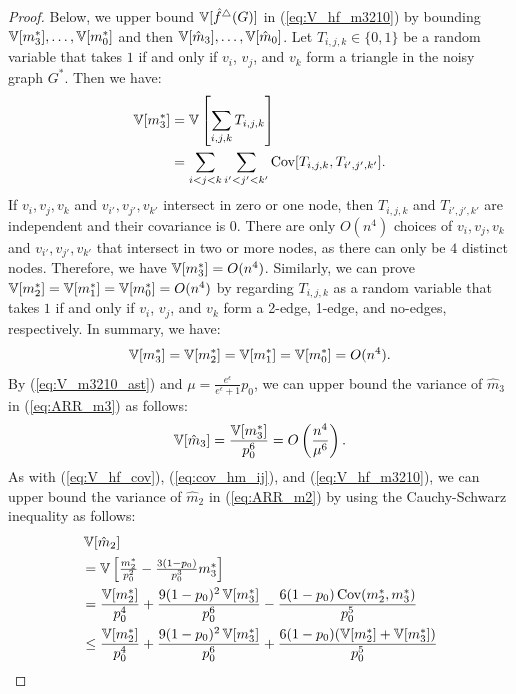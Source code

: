 \begin{proof}
Below, we upper bound $\operatorname{\mathbb{V}}[\hat{f}^\triangle(G)]$ in (\ref{eq:V_hf_m3210}) by bounding $\operatorname{\mathbb{V}}[m_3^*], \ldots, \allowbreak \operatorname{\mathbb{V}}[m_0^*]$ and then $\operatorname{\mathbb{V}}[\hat{m}_3], \ldots, \allowbreak \operatorname{\mathbb{V}}[\hat{m}_0]$.
Let $T_{i,j,k} \in \{0,1\}$ be a random variable that takes $1$ if and only if $v_i$, $v_j$, and $v_k$ form a triangle in the noisy graph $G^*$.
Then we have:
\begin{align*}
    \operatorname{\mathbb{V}}[m_3^*]
    &= \operatorname{\mathbb{V}}\left[\sum_{i,j,k} T_{i,j,k}\right] \\
    &= \sum_{i<j<k} \sum_{i'<j'<k'} \operatorname{\text{Cov}}[T_{i,j,k}, T_{i',j',k'}].
\end{align*}
If $v_i, v_j, v_k$ and $v_{i'}, v_{j'}, v_{k'}$ intersect in zero or one node, then $T_{i,j,k}$ and $T_{i',j',k'}$ are independent
and their covariance is $0$.
There are only $O(n^4)$ choices of $v_i, v_j, v_k$ and $v_{i'}, v_{j'}, v_{k'}$ that intersect in two or more nodes, as there can only be $4$ distinct nodes.
Therefore, we have $\operatorname{\mathbb{V}}[m_3^*] = O(n^4)$.
Similarly, we can prove $\operatorname{\mathbb{V}}[m_2^*] = \operatorname{\mathbb{V}}[m_1^*] = \operatorname{\mathbb{V}}[m_0^*] = O(n^4)$ by regarding $T_{i,j,k}$ as a random variable that takes $1$ if and only if $v_i$, $v_j$, and $v_k$ form a 2-edge, 1-edge, and no-edges, respectively.
In summary, we have:
\begin{align}
    \operatorname{\mathbb{V}}[m_3^*] = \operatorname{\mathbb{V}}[m_2^*] = \operatorname{\mathbb{V}}[m_1^*] = \operatorname{\mathbb{V}}[m_0^*] = O(n^4).
    \label{eq:V_m3210_ast}
\end{align}
By (\ref{eq:V_m3210_ast}) and $\mu = \frac{e^\epsilon}{e^\epsilon+1} p_0$, we can upper bound the variance of $\hat{m}_3$ in (\ref{eq:ARR_m3}) as follows:
\begin{align*}
    \operatorname{\mathbb{V}}[\hat{m}_3]
    = \frac{\operatorname{\mathbb{V}}[m_3^*]}{p_0^6}
    = O\left(\frac{n^4}{\mu^6}\right).
\end{align*}
As with (\ref{eq:V_hf_cov}), (\ref{eq:cov_hm_ij}), and (\ref{eq:V_hf_m3210}), we can upper bound the variance of $\hat{m}_2$ in (\ref{eq:ARR_m2}) by using the Cauchy-Schwarz inequality as follows:
\begin{align*}
    & \V[\hat{m}_2] \\
    &= \textstyle{\V\left[\frac{m_2^*}{p_0^2} - \frac{3(1-p_0)}{p_0^3}m_3^*\right]} \\
    &= \frac{\V[m_2^*]}{p_0^4} + \frac{9(1-p_0)^2\V[m_3^*]}{p_0^6} - \frac{6(1-p_0)\cov(m_2^*,m_3^*)}{p_0^5} \\
    &\leq \frac{\V[m_2^*]}{p_0^4} + \frac{9(1-p_0)^2\V[m_3^*]}{p_0^6} + \frac{6(1-p_0)(\V[m_2^*]+\V[m_3^*])}{p_0^5} \\

\end{align*}
\end{proof}
